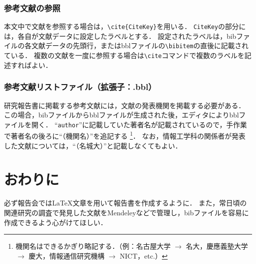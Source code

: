 \documentclass[uplatex]{jsarticle}
\begin{document}
\subsubsection{参考文献の参照}
本文中で文献を参照する場合は，\verb|\cite{CiteKey}|を用いる\cite{GSRA-Proxy}．
\texttt{CiteKey}の部分には，各自が文献データに設定したラベルとする．
設定されたラベルは，bibファイルの各文献データの先頭行，またはbblファイルの\verb|\bibitem|の直後に記載されている．
複数の文献を一度に参照する場合は\verb|\cite|コマンドで複数のラベルを記述すればよい\cite{IdLocatorTransport,Android80221Handover}．

\subsubsection{参考文献リストファイル（拡張子：.bbl）}
研究報告書に掲載する参考文献には，文献の発表機関を掲載する必要がある．
この場合，bibファイルからbblファイルが生成された後，エディタによりbblファイルを開く．
``\texttt{author}''に記載していた著者名が記載されているので，手作業で著者名の後ろに``（機関名）''を追記する
\footnote{機関名はできるかぎり略記する．（例：名古屋大学 $\rightarrow$ 名大，慶應義塾大学 $\rightarrow$ 慶大，情報通信研究機構 $\rightarrow$ NICT，etc.）}．
なお，情報工学科の関係者が発表した文献については，``（名城大）''と記載しなくてもよい．


\section{おわりに}
必ず報告会では\LaTeX 文章を用いて報告書を作成するように．
また，常日頃の関連研究の調査で発見した文献をMendeleyなどで管理し，bibファイルを容易に作成できるよう心がけてほしい．




\appendix
\end{document}
